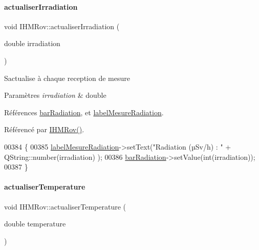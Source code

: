 \paragraph{\texorpdfstring{actualiser\+Irradiation}{actualiserIrradiation}}
{\footnotesize\ttfamily void I\+H\+M\+Rov\+::actualiser\+Irradiation (\begin{DoxyParamCaption}\item[{double}]{irradiation }\end{DoxyParamCaption})\hspace{0.3cm}{\ttfamily [slot]}}

S\textquotesingle{}actualise à chaque reception de mesure


\begin{DoxyParams}{Paramètres}
{\em irradiation} & double \\
\hline
\end{DoxyParams}


Références \hyperlink{class_i_h_m_rov_a06f0850e46f735c3418360280f6c8336}{bar\+Radiation}, et \hyperlink{class_i_h_m_rov_aaa9588a64c4af2f9fb08c62519a05c5a}{label\+Mesure\+Radiation}.



Référencé par \hyperlink{class_i_h_m_rov_a5dac1fb4612866cc61f699a415e0ef6b}{I\+H\+M\+Rov()}.


\begin{DoxyCode}
00384 \{
00385     \hyperlink{class_i_h_m_rov_aaa9588a64c4af2f9fb08c62519a05c5a}{labelMesureRadiation}->setText(\textcolor{stringliteral}{"Radiation (µSv/h) : "} + QString::number(irradiation)
      );
00386     \hyperlink{class_i_h_m_rov_a06f0850e46f735c3418360280f6c8336}{barRadiation}->setValue(\textcolor{keywordtype}{int}(irradiation));
00387 \}
\end{DoxyCode}
\mbox{\label{class_i_h_m_rov_ae5f2c89b06d7dc09e9974428b14799f1}} 
\paragraph{\texorpdfstring{actualiser\+Temperature}{actualiserTemperature}}
{\footnotesize\ttfamily void I\+H\+M\+Rov\+::actualiser\+Temperature (\begin{DoxyParamCaption}\item[{double}]{temperature }\end{DoxyParamCaption})\hspace{0.3cm}{\ttfamily [slot]}}

